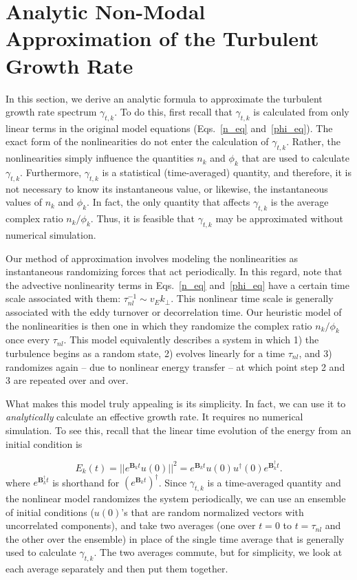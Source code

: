\documentclass[twocolumn,showkeys,superscriptaddress]{revtex4}
\def\beq{\begin{equation}}
\def\eeq{\end{equation}}
\begin{document}
\section{Analytic Non-Modal Approximation of the Turbulent Growth Rate}
\label{sec_nm_procedure}

In this section, we derive an analytic formula to approximate the turbulent growth rate spectrum $\gamma_{t,k}$. To do this, first recall that $\gamma_{t,k}$ is calculated
from only linear terms in the original model equations (Eqs.~\ref{n_eq} and~\ref{phi_eq}). The exact form of the nonlinearities do not enter the calculation of $\gamma_{t,k}$. Rather, the nonlinearities
simply influence the quantities $n_k$ and $\phi_k$ that are used to calculate $\gamma_{t,k}$. Furthermore, $\gamma_{t,k}$ is a statistical (time-averaged) quantity, and therefore, it is not
necessary to know its instantaneous value, or likewise, the instantaneous values of $n_k$ and $\phi_k$. In fact, the only quantity that affects $\gamma_{t,k}$ is the average complex ratio $n_k/\phi_k$.
Thus, it is feasible that $\gamma_{t,k}$ may be approximated without numerical simulation.

Our method of approximation involves modeling the nonlinearities as instantaneous randomizing forces that act periodically.
In this regard, note that the advective nonlinearity terms in Eqs.~\ref{n_eq} and~\ref{phi_eq} have a certain time scale associated with them: $\tau_{nl}^{-1} \sim v_E k_\perp$.
This nonlinear time scale is generally associated with the eddy turnover or decorrelation time. Our heuristic model of the nonlinearities is then one
in which they randomize the complex ratio $n_k/\phi_k$ once every $\tau_{nl}$.
This model equivalently describes a system in which 1) the turbulence begins as a random state, 
2) evolves linearly for a time $\tau_{nl}$, and 3) randomizes again -- due to nonlinear energy transfer -- at which point step 2 and 3 are repeated over and over.

What makes this model truly appealing is its simplicity. In fact, we can use it to \emph{analytically} calculate an effective growth rate. It requires no numerical simulation.
To see this, recall that the linear time evolution of the energy from an initial condition is

\beq
\label{E_t_from_u0}
E_k(t) = ||e^{\mathbf{B}_k t} u(0)||^2 = e^{\mathbf{B}_k t} u(0) u^{\dagger}(0) e^{\mathbf{B}_k^{\dagger}t}.
\eeq
where $e^{\mathbf{B}_k^{\dagger}t}$ is shorthand for $\left( e^{\mathbf{B}_k t} \right)^{\dagger}$.
Since $\gamma_{t,k}$ is a time-averaged quantity and the nonlinear model randomizes the system periodically, we can use an ensemble of initial conditions ($u(0)$'s that are random normalized vectors with uncorrelated components),
and take two averages (one over $t=0$ to $t = \tau_{nl}$ and the other over the ensemble) in place of the single time average that is generally used to calculate $\gamma_{t,k}$. The two averages commute, but for simplicity, 
we look at each average separately and then put them together.
\end{document}
